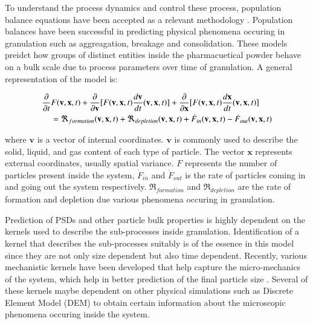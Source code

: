 \documentclass[preprint,10pt,authoryear]{elsarticle}
\begin{document}
\begin{linenumbers}
To understand the process dynamics and control these process, population balance equations 
have been accepted as a relevant methodology \citep{Immanuel2005}. Population balances have been successful in 
predicting physical phenomena occuring in granulation such as aggreagation, breakage and 
consolidation. These models preidct how groups of distinct entities inside the pharmacuetical 
powder behave on a bulk scale due to process parameters over time of granulation. A
general representation of the model is:

\begin{align}
\frac{ \partial}{\partial t}&F(\textbf{v},\textbf{x},t) + \frac{\partial}{\partial 
\textbf{v}}[F(\textbf{v},\textbf{x},t)\frac{d\textbf{v}}{dt}(\textbf{v},\textbf{x},t)] 
+ \frac{\partial}{\partial \textbf{x}}[F(\textbf{v},\textbf{x},t)\frac{d\textbf{x}}{dt}
(\textbf{v},\textbf{x},t)] \notag\\
    &= 
\Re_{formation}(\textbf{v},\textbf{x},t)+\Re_{depletion}(\textbf{v},\textbf{x},t)
+\dot{F}_{in}(\textbf{v},\textbf{x},t) -\dot{F}_{out}(\textbf{v},\textbf{x},t) 
\label{eqn:bkgd_pbm_general} 
\end{align}

where $\textbf{v}$ is a vector of internal 
coordinates.  $\textbf{v}$ is commonly used to describe the solid, liquid, 
and gas content of each type of particle. The vector $\textbf{x}$ represents 
external coordinates, usually spatial variance. $F$ represents the 
number of particles present inside the system, $\dot{F}_{in}$ 
and $\dot{F}_{out}$ is the rate of particles coming in and going out the 
system respectively. $\Re_{formation}$ and $\Re_{depletion}$ are the rate of 
formation and depletion due various phenomena occuring in granulation. 

Prediction of PSDs and other particle bulk properties is highly dependent on 
the kernels used to describe the sub-processes inside granulation. Identification 
of a kernel that describes the sub-processes suitably is of the essence in this model 
since they are not only size dependent but also time dependent. Recently, various 
mechanistic kernels have been developed that help capture the micro-mechanics of the 
system, which help in better prediction of the final particle size \citep{Barrasso2015processes}. 
Several of these kernels maybe dependent on other physical simulations such as Discrete 
Element Model (DEM) to obtain certain information about the microscopic phenomena 
occuring inside the system.



\end{linenumbers}
\end{document}
